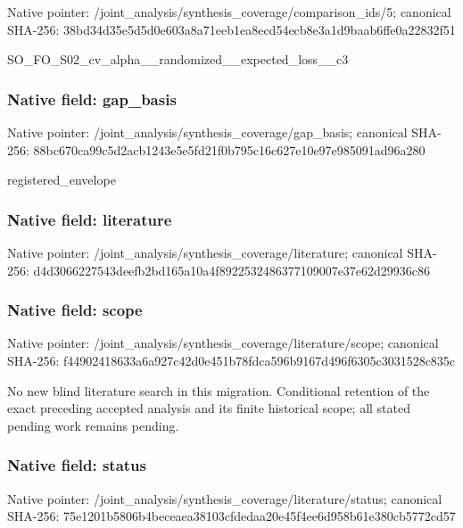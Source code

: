 \documentclass[10pt,a4paper]{article}
\begin{document}
Native pointer: /joint\_analysis/synthesi\allowbreak{}s\_coverage/comparison\_id\allowbreak{}s/5; canonical SHA-256: 38bd34d35e5d5d0e603a8a71\allowbreak{}eeb1ea8ecd54ecb8e3a1d9ba\allowbreak{}ab6ffe0a22832f51


SO\_FO\_S02\_cv\_alpha\_\_rand\allowbreak{}omized\_\_expected\_loss\_\_c\allowbreak{}3


\subsubsection{Native field: gap\_basis}


Native pointer: /joint\_analysis/synthesi\allowbreak{}s\_coverage/gap\_basis; canonical SHA-256: 88bc670ca99c5d2acb1243e5\allowbreak{}e5fd21f0b795c16c627e10e9\allowbreak{}7e985091ad96a280


registered\_envelope


\subsubsection{Native field: literature}


Native pointer: /joint\_analysis/synthesi\allowbreak{}s\_coverage/literature; canonical SHA-256: d4d3066227543deefb2bd165\allowbreak{}a10a4f892253248637710900\allowbreak{}7e37e62d29936c86



\subsubsection{Native field: scope}


Native pointer: /joint\_analysis/synthesi\allowbreak{}s\_coverage/literature/sc\allowbreak{}ope; canonical SHA-256: f44902418633a6a927c42d0e\allowbreak{}451b78fdca596b9167d496f6\allowbreak{}305c3031528c835c


No new blind literature search in this migration. Conditional retention of the exact preceding accepted analysis and its finite historical scope; all stated pending work remains pending.


\subsubsection{Native field: status}


Native pointer: /joint\_analysis/synthesi\allowbreak{}s\_coverage/literature/st\allowbreak{}atus; canonical SHA-256: 75e1201b5806b4beceaea381\allowbreak{}03cfdedaa20e45f4ee6d958b\allowbreak{}61e380cb5772cd57
\end{document}
